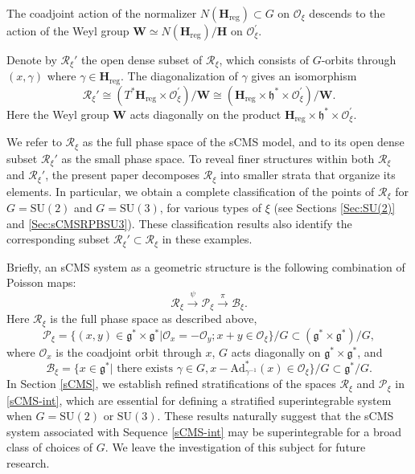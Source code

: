 \documentclass[12pt]{amsart}
\theoremstyle{definition}
\numberwithin{equation}{section}
\newcommand{\SU}{\mathrm{SU}}
\newcommand{\Oxi}{\mathcal{O}_{\xi}}
\newcommand{\Reducedxi}{\mathcal{R}_\xi}
\newcommand{\Pxi}{\mathcal{P}_{\xi}}
\newcommand{\Adjointaction}{\mathrm{Ad}}
\newcommand{\Hreg}{\Cartan_{\mathrm{reg}}}
\newcommand{\Cartan}{\mathbf{H}}
\newcommand{\cartan}{\mathfrak{h}}
\newcommand{\Oprimexi}{\mathcal{O}^{\prime}_{\xi}}
\begin{document}
The coadjoint action of the normalizer $N(\Hreg )\subset G$  on $\Oxi$ descends to the action of the Weyl group $\mathbf{W}\simeq N(\Hreg )/\Cartan$ on $\Oprimexi$. 

Denote by  $\Reducedxi'$ the open dense subset of $\Reducedxi$, which consists of $G$-orbits through $(x,\gamma)$ where $\gamma\in \Hreg $. The diagonalization of $\gamma$ gives an isomorphism
$$
\Reducedxi' \cong (T^* \Hreg  \times \Oprimexi)/\mathbf{W} \cong (\Hreg \times \cartan^* \times \Oprimexi)/\mathbf{W}.
$$
Here the Weyl group $\mathbf{W}$ acts diagonally on the product $\Hreg \times \cartan^* \times \Oprimexi$.

We refer to \(\Reducedxi\) as the full phase space of the sCMS model, and to its open dense subset \(\Reducedxi'\) as the small phase space. To reveal finer structures within both \(\Reducedxi\) and \(\Reducedxi'\), the present paper decomposes \(\Reducedxi\) into smaller strata that organize its elements. In particular, we obtain a complete classification of the points of \(\Reducedxi\) for \(G=\SU(2)\) and \(G=\SU(3)\), for various types of \(\xi\) (see Sections \ref{Sec:SU(2)} and \ref{Sec:sCMSRPBSU3}). These classification results also identify the corresponding subset \(\Reducedxi' \subset \Reducedxi\) in these examples.

 
Briefly,   an sCMS   system as a geometric structure is the following combination of Poisson maps:
\begin{equation}\label{sCMS-int}
\Reducedxi\stackrel{\psi}\rightarrow \mathcal{P}_{\xi}\stackrel{\pi}\rightarrow \mathcal{B}_\xi.
\end{equation}
Here $\Reducedxi$ is the full phase space as described above,
\[
\mathcal{P}_{\xi}=\{(x,y)\in \mathfrak{g^*}\times \mathfrak{g^*}|\mathcal{O}_x=-\mathcal{O}_y; x+y\in \mathcal{O}_\xi\}/G\subset (\mathfrak{g^*}\times \mathfrak{g^*})/G,
\]
where $\mathcal{O}_x$ is the coadjoint orbit through $x$, $G$ acts diagonally on $\mathfrak{g^*}\times \mathfrak{g^*}$, and 
\[
\mathcal{B}_\xi=\{x\in \mathfrak{g}^*| \mbox{ there exists }\gamma\in G, x-\Adjointaction^*_{\gamma^{-1}}(x)\in \Oxi\}/G\subset  \mathfrak{g}^*/G.
\]
In Section \ref{sCMS}, we establish refined stratifications of the spaces $\Reducedxi$ and $\Pxi$ in \eqref{sCMS-int},  which are essential for defining a stratified superintegrable system when $G=\SU(2)$ or $\SU(3)$. These results naturally suggest that the sCMS system associated with Sequence \eqref{sCMS-int} may be superintegrable for a broad class of choices of $G$. We leave the investigation of this subject for future research.
 
\end{document}
